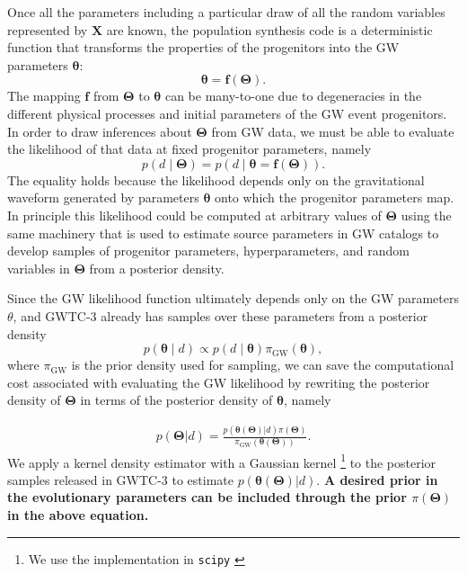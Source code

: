 \documentclass[linenumbers,twocolumn]{aastex631}
\begin{document}
Once all the parameters including a particular draw of all the random variables
represented by $\bm{X}$ are known, the population synthesis code is a
deterministic function that transforms the properties of the progenitors into
the GW parameters $\bm{\theta}$:
\begin{equation}
    \bm{\theta} = \bm{f}\left( \bm{\Theta} \right).
\end{equation}
The mapping $\bm{f}$ from $\bm{\Theta}$ to $\bm{\theta}$ can be many-to-one due
to degeneracies in the different physical processes and initial parameters of
the GW event progenitors. In order to draw inferences about $\bm{\Theta}$ from
GW data, we must be able to evaluate the likelihood of that data at fixed
progenitor parameters, namely
\begin{equation}
    p\left( d \mid \bm{\Theta} \right) = p\left( d \mid \bm{\theta} = \bm{f}\left( \bm{\Theta} \right) \right).
\end{equation}
The equality holds because the likelihood depends only on the gravitational
waveform generated by parameters $\bm{\theta}$ onto which the progenitor
parameters map.  In principle this likelihood could be computed at arbitrary
values of $\bm{\Theta}$ using the same machinery that is used to estimate source
parameters in GW catalogs \citep{Veitch2015,Ashton2019,Romero-Shaw2020,GWTC-3}
to develop samples of progenitor parameters, hyperparameters, and random
variables in $\bm{\Theta}$ from a posterior density.

Since the GW likelihood function ultimately depends only on the GW parameters
$\theta$, and GWTC-3 already has samples over these parameters from a posterior
density
\begin{equation}
    p\left( \bm{\theta} \mid d \right) \propto p\left( d \mid \bm{\theta} \right) \pi_\mathrm{GW} \left( \bm{\theta} \right),
\end{equation}
where $\pi_\mathrm{GW}$ is the prior density used for sampling, we can save the
computational cost associated with evaluating the GW likelihood by rewriting the
posterior density of $\bm{\Theta}$ in terms of the posterior density of
$\bm{\theta}$, namely

\begin{align}
    p(\bm{\Theta} | d) = \frac{p(\bm{\theta}(\bm{\Theta})| d) \pi(\bm{\Theta})}{\pi_\mathrm{GW}(\bm{\theta}(\bm{\Theta}))}.
\end{align}
We apply a kernel density estimator with a Gaussian kernel \footnote{We use the
implementation in \texttt{scipy} \cite{2020SciPy-NMeth}} to the posterior
samples released in GWTC-3 to estimate $p(\bm{\theta}(\bm{\Theta})|d)$.
\textbf{A desired prior in the evolutionary parameters can be included through
the prior $\pi(\bm{\Theta})$ in the above equation.}
\end{document}
